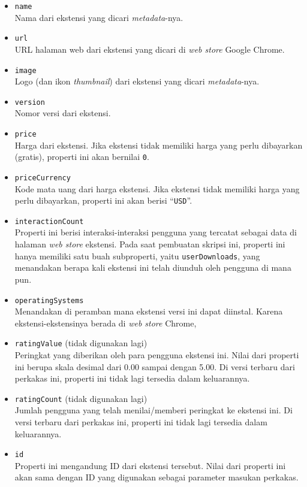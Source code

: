 \begin{itemize}
	\item \verb|name|\\
	Nama dari ekstensi yang dicari \textit{metadata}-nya.
	\item \verb|url|\\
	URL halaman web dari ekstensi yang dicari di \textit{web store} Google Chrome.
	\item \verb|image|\\
	Logo (dan ikon \textit{thumbnail}) dari ekstensi yang dicari \textit{metadata}-nya.
	\item \verb|version|\\
	Nomor versi dari ekstensi.
	\item \verb|price|\\
	Harga dari ekstensi. Jika ekstensi tidak memiliki harga yang perlu dibayarkan (gratis), properti ini akan bernilai \verb|0|.
	\item \verb|priceCurrency|\\
	Kode mata uang dari harga ekstensi. Jika ekstensi tidak memiliki harga yang perlu dibayarkan, properti ini akan berisi ``\verb|USD|''.
	\item \verb|interactionCount|\\
	Properti ini berisi interaksi-interaksi pengguna yang tercatat sebagai data di halaman \textit{web store} ekstensi. Pada saat pembuatan skripsi ini, properti ini hanya memiliki satu buah subproperti, yaitu \verb|userDownloads|, yang menandakan berapa kali ekstensi ini telah diunduh oleh pengguna di mana pun.
	\item \verb|operatingSystems|\\
	Menandakan di peramban mana ekstensi versi ini dapat diinstal. Karena ekstensi-ekstensinya berada di \textit{web store} Chrome,
	\item \verb|ratingValue| (tidak digunakan lagi)\\
	Peringkat yang diberikan oleh para pengguna ekstensi ini. Nilai dari properti ini berupa skala desimal dari 0.00 sampai dengan 5.00. Di versi terbaru dari perkakas ini, properti ini tidak lagi tersedia dalam keluarannya.
	\item \verb|ratingCount| (tidak digunakan lagi)\\
	Jumlah pengguna yang telah menilai/memberi peringkat ke ekstensi ini. Di versi terbaru dari perkakas ini, properti ini tidak lagi tersedia dalam keluarannya.
	\item \verb|id|\\
	Properti ini mengandung ID dari ekstensi tersebut. Nilai dari properti ini akan sama dengan ID yang digunakan sebagai parameter masukan perkakas.
\end{itemize}
